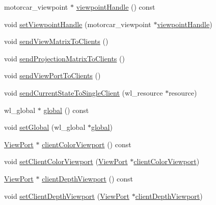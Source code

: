 \begin{DoxyCompactItemize}
\item 
motorcar\-\_\-viewpoint $\ast$ \hyperlink{classmotorcar_1_1ViewPoint_a4a1e5b188d201d3361f80c841348bc75}{viewpoint\-Handle} () const 
\item 
void \hyperlink{classmotorcar_1_1ViewPoint_a7d053ccb05ea7ee464433a2b01d711ed}{set\-Viewpoint\-Handle} (motorcar\-\_\-viewpoint $\ast$\hyperlink{classmotorcar_1_1ViewPoint_a4a1e5b188d201d3361f80c841348bc75}{viewpoint\-Handle})
\item 
void \hyperlink{classmotorcar_1_1ViewPoint_ac48a96b38c8e60073cb52d73cb320f60}{send\-View\-Matrix\-To\-Clients} ()
\item 
void \hyperlink{classmotorcar_1_1ViewPoint_adcbd2b4dcb3152481b7ac488e72f7f4e}{send\-Projection\-Matrix\-To\-Clients} ()
\item 
void \hyperlink{classmotorcar_1_1ViewPoint_ac3f5cc3f1679e4320bd0e46a4380bdf7}{send\-View\-Port\-To\-Clients} ()
\item 
void \hyperlink{classmotorcar_1_1ViewPoint_a48ab341588511e267aded9295c1452a0}{send\-Current\-State\-To\-Single\-Client} (wl\-\_\-resource $\ast$resource)
\item 
wl\-\_\-global $\ast$ \hyperlink{classmotorcar_1_1ViewPoint_aa4851dabec3c43f99467edacc08c8283}{global} () const 
\item 
void \hyperlink{classmotorcar_1_1ViewPoint_a5672ddf147b8a3c8f83574dba9afb5b0}{set\-Global} (wl\-\_\-global $\ast$\hyperlink{classmotorcar_1_1ViewPoint_aa4851dabec3c43f99467edacc08c8283}{global})
\item 
\hyperlink{classmotorcar_1_1ViewPort}{View\-Port} $\ast$ \hyperlink{classmotorcar_1_1ViewPoint_a746526fab6dda97be6ec00a1d480ac71}{client\-Color\-Viewport} () const 
\item 
void \hyperlink{classmotorcar_1_1ViewPoint_adc449139ba7904c3f8f388728aae383a}{set\-Client\-Color\-Viewport} (\hyperlink{classmotorcar_1_1ViewPort}{View\-Port} $\ast$\hyperlink{classmotorcar_1_1ViewPoint_a746526fab6dda97be6ec00a1d480ac71}{client\-Color\-Viewport})
\item 
\hyperlink{classmotorcar_1_1ViewPort}{View\-Port} $\ast$ \hyperlink{classmotorcar_1_1ViewPoint_ab393381a7b22ede65329653dbc472b72}{client\-Depth\-Viewport} () const 
\item 
void \hyperlink{classmotorcar_1_1ViewPoint_a51c6c3a455cc2adc10daab9a5cfc461d}{set\-Client\-Depth\-Viewport} (\hyperlink{classmotorcar_1_1ViewPort}{View\-Port} $\ast$\hyperlink{classmotorcar_1_1ViewPoint_ab393381a7b22ede65329653dbc472b72}{client\-Depth\-Viewport})
\item 

\end{DoxyCompactItemize}
